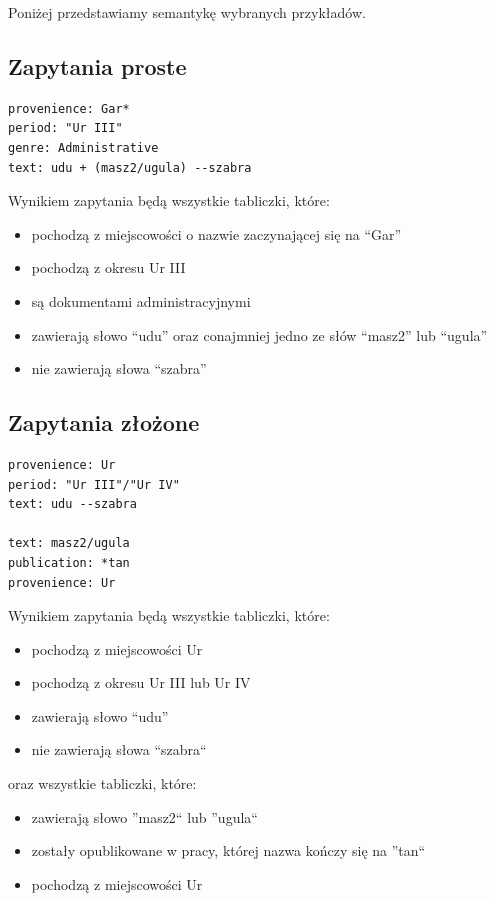 \documentclass{pracamgr}
\begin{document}
Poniżej przedstawiamy semantykę wybranych przykładów.
\subsection{Zapytania proste}
\begin{verbatim}
provenience: Gar*
period: "Ur III"
genre: Administrative
text: udu + (masz2/ugula) --szabra
\end{verbatim}
Wynikiem zapytania będą wszystkie tabliczki, które:
\begin{itemize}
 \item pochodzą z miejscowości o nazwie zaczynającej się na ``Gar''
\item pochodzą z okresu Ur III
\item są dokumentami administracyjnymi
\item zawierają słowo ``udu'' oraz conajmniej jedno ze słów ``masz2'' lub ``ugula''
\item nie zawierają słowa ``szabra''
\end{itemize}


\subsection{Zapytania złożone}
\begin{verbatim}
provenience: Ur
period: "Ur III"/"Ur IV"
text: udu --szabra

text: masz2/ugula
publication: *tan
provenience: Ur
\end{verbatim}
Wynikiem zapytania będą wszystkie tabliczki, które:
\begin{itemize}
 \item pochodzą z miejscowości Ur
 \item pochodzą z okresu Ur III lub Ur IV
 \item zawierają słowo ``udu''
 \item nie zawierają słowa ``szabra``
\end{itemize}
oraz wszystkie tabliczki, które:
\begin{itemize}
 \item zawierają słowo ''masz2`` lub ''ugula``
 \item zostały opublikowane w pracy, której nazwa kończy się na ''tan``
 \item pochodzą z miejscowości Ur
\end{itemize}
\end{document}
